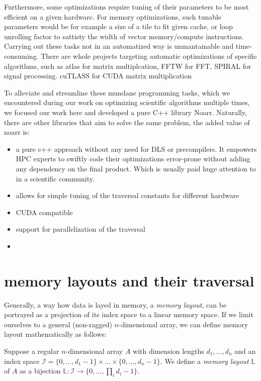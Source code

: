 Furthermore, some optimizations require tuning of their parameters to be most efficient on a given hardware. For memory optimizations, such tunable parameters would be for example a size of a tile to fit given cache, or loop unrolling factor to sattisty the width of vector memory/compute instructions. Carrying out these tasks not in an automatized way is unmantainable and time-consuming. There are whole projects targeting automatic optimizations of specific algorithms, such as atlas for matrix multiplcation, FFTW for FFT, SPIRAL for signal processing. cuTLASS for CUDA matrix multiplication

To alleviate and streamline these mundane programming tasks, which we encountered during our work on optimizing scientific algorithms multiple times, we focused our work here and developed a pure C++ library Noarr. Naturally, there are other libraries that aim to solve the same problem, the added value of noarr is:
\begin{itemize}
  \item a pure c++ approach without any need for DLS or precompilers. It empowers HPC experts to swiftly code their optimizations error-prone without adding any dependency on the final product. Which is usually paid huge attention to in a scientific community.
  \item allows for simple tuning of the traversal constants for different hardware
  \item CUDA compatible
  \item support for parallelization of the traversal
  \item %
\end{itemize}


\section{memory layouts and their traversal}

Generally, a way how data is layed in memory, a \emph{memory layout}, can be portrayed as a projection of its index space to a linear memory space. If we limit ourselves to a general (non-ragged) $n$-dimensional array, we can define memory layout mathematically as follows:

\begin{defn}
  Suppose a regular $n$-dimensional array $A$ with dimension lengths $d_1, \dots, d_n$ and an index space $\mathcal{I} = \{0,\dots,d_1 - 1\}\times \dots \times \{0,\dots,d_n - 1\}$. We define a \emph{memory layout} $\mathbb{L}$ of $A$ as a bijection $\mathbb{L}: \mathcal{I} \to \{0,\dots, \prod_{i}d_i - 1\}$. 
\end{defn}


